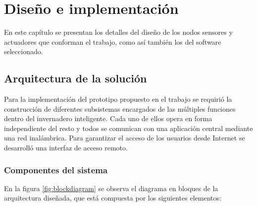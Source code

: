 

\chapter{Diseño e implementación} %

\label{Chapter3} %



En este capítulo se presentan los detalles del diseño de los nodos sensores y actuadores que conforman el trabajo, como así también los del software seleccionado.

\section{Arquitectura de la solución}
\label{sec:Arquitectura de la solución}


Para la implementación del prototipo propuesto en el trabajo se requirió la construcción de diferentes subsistemas encargados de las múltiples funciones dentro del invernadero inteligente. Cada uno de ellos opera en forma independiente del resto y todos se comunican con una aplicación central mediante una red inalámbrica. 
Para garantizar el acceso de los usuarios desde Internet se desarrolló una interfaz de acceso remoto.





\subsection{Componentes del sistema}
\label{Componentes del sistema}

En la figura \ref{fig:blockdiagram} se observa el diagrama en bloques de la arquitectura diseñada, que está compuesta por los siguientes elementos: 

